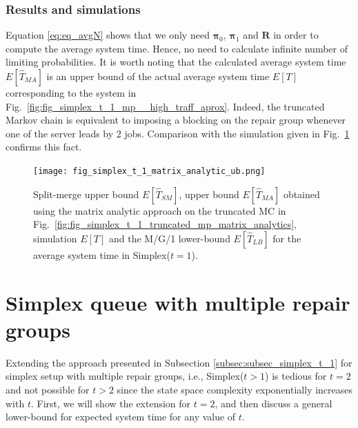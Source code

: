 \documentclass[sigconf,draft]{acmart}
\begin{document}
\subsubsection{Results and simulations} Equation \eqref{eq:eq_avgN} shows that we only need $\bm{\pi}_0$, $\bm{\pi}_1$ and $\bm{R}$ in order to compute the average system time. Hence, no need  to calculate infinite number of limiting probabilities. It is worth noting that the calculated average system time $E[\hat{T}_{MA}]$ is an upper bound of the actual average system time $E[T]$ corresponding to the system in Fig.~\ref{fig:fig_simplex_t_1_mp__high_traff_aprox}. Indeed, the truncated Markov chain is equivalent to imposing a blocking on the repair group whenever one of the server leads by 2 jobs. Comparison with the simulation given in Fig.~\ref{fig:fig_simplex_t_1_matrix_analytic_ub} confirms this fact. 
\begin{figure}[h]
  \centering
  \texttt{[image: fig\_simplex\_t\_1\_matrix\_analytic\_ub.png]}
  \caption{Split-merge upper bound $E[\hat{T}_{SM}]$, upper bound $E[\hat{T}_{MA}]$ obtained using the matrix analytic approach on the truncated MC in Fig.~\ref{fig:fig_simplex_t_1_truncated_mp_matrix_analytics}, simulation $E[T]$ and the M/G/1 lower-bound $E[\hat{T}_{LB}]$ for the average system time in Simplex($t=1$).}
  \label{fig:fig_simplex_t_1_matrix_analytic_ub}
\end{figure}

\section{Simplex queue with multiple repair groups}
\label{sec:sec_simplex_avg_sys_time}
Extending the approach presented in Subsection \ref{subsec:subsec_simplex_t_1} for simplex setup with multiple repair groups, i.e., Simplex($t > 1$) is tedious for $t=2$ and not possible for $t > 2$ since the state space complexity exponentially increases with $t$. First, we will show the extension for $t=2$, and then discuss a general lower-bound for expected system time for any value of $t$.

\end{document}
